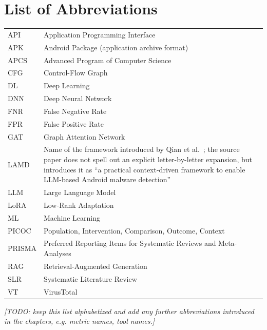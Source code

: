 \chapter*{List of Abbreviations}
\label{abbreviations}

\begin{tabular}{ll}
API & Application Programming Interface \\
APK & Android Package (application archive format) \\
APCS & Advanced Program of Computer Science \\
CFG & Control-Flow Graph \\
DL & Deep Learning \\
DNN & Deep Neural Network \\
FNR & False Negative Rate \\
FPR & False Positive Rate \\
GAT & Graph Attention Network \\
LAMD & Name of the framework introduced by Qian et al.~\cite{Qian2025-ua}; the source paper does not spell out an explicit letter-by-letter expansion, but introduces it as ``a practical context-driven framework to enable LLM-based Android malware detection'' \\
LLM & Large Language Model \\
LoRA & Low-Rank Adaptation \\
ML & Machine Learning \\
PICOC & Population, Intervention, Comparison, Outcome, Context \\
PRISMA & Preferred Reporting Items for Systematic Reviews and Meta-Analyses \\
RAG & Retrieval-Augmented Generation \\
SLR & Systematic Literature Review \\
VT & VirusTotal \\
\end{tabular}

\textit{[TODO: keep this list alphabetized and add any further abbreviations
introduced in the chapters, e.g. metric names, tool names.]}
